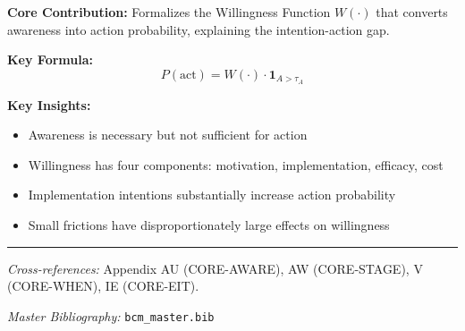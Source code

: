 \begin{tcolorbox}[colback=gray!5!white, colframe=gray!75!black,
    title=Appendix AV Summary: CORE-READY]

\textbf{Core Contribution:}
Formalizes the Willingness Function $W(\cdot)$ that converts awareness into
action probability, explaining the intention-action gap.

\textbf{Key Formula:}
\begin{equation}
P(\text{act}) = W(\cdot) \cdot \mathbf{1}_{A > \tau_A}
\end{equation}

\textbf{Key Insights:}
\begin{itemize}[nosep]
\item Awareness is necessary but not sufficient for action
\item Willingness has four components: motivation, implementation, efficacy, cost
\item Implementation intentions substantially increase action probability
\item Small frictions have disproportionately large effects on willingness
\end{itemize}

\end{tcolorbox}

\vspace{1em}
\hrule
\vspace{0.5em}

\noindent\textit{Cross-references:}
Appendix AU (CORE-AWARE), AW (CORE-STAGE), V (CORE-WHEN), IE (CORE-EIT).

\noindent\textit{Master Bibliography:} \texttt{bcm\_master.bib}

\nocite{bcm_master}

